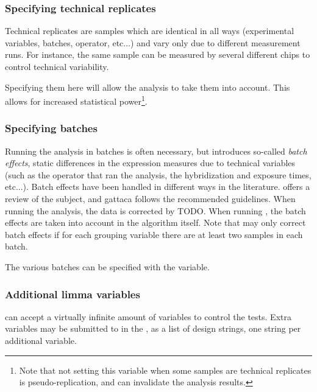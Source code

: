 \subsubsection{Specifying technical replicates}
Technical replicates are samples which are identical in all ways (experimental variables, batches, operator, etc...) and vary only due to different measurement runs. For instance, the same sample can be measured by several different chips to control technical variability.

Specifying them here will allow the analysis to take them into account. This allows for increased statistical power\footnote{Note that not setting this variable when some samples are technical replicates is pseudo-replication, and can invalidate the analysis results.}.

\subsubsection{Specifying batches}
Running the analysis in batches is often necessary, but introduces so-called \textit{batch effects}, static differences in the expression measures due to technical variables (such as the operator that ran the analysis, the hybridization and exposure times, etc...). Batch effects have been handled in different ways in the literature. \textcite{nygaardMethodsThatRemove2016} offers a review of the subject, and \gls{gattaca} follows the recommended guidelines. When running the  analysis, the data is corrected by TODO. When running , the batch effects are taken into account in the algorithm itself. Note that  may only correct batch effects if for each grouping variable there are at least two samples in each batch.

The various batches can be specified with the  variable.

\subsubsection{Additional limma variables}

 can accept a virtually infinite amount of variables to control the tests. Extra variables may be submitted to  in the , as a list of design strings, one string per additional variable.

